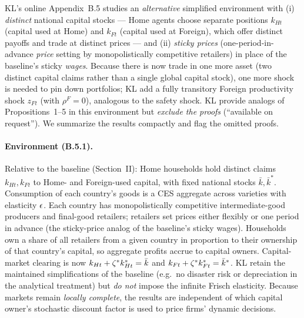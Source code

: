 KL's online Appendix~B.5 studies an \emph{alternative} simplified environment with
(i) \emph{distinct} national capital stocks --- Home agents choose separate
positions $k_{Ht}$ (capital used at Home) and $k_{Ft}$ (capital used at Foreign),
which offer distinct payoffs and trade at distinct prices --- and (ii) \emph{sticky
prices} (one-period-in-advance \emph{price} setting by monopolistically
competitive retailers) in place of the baseline's sticky \emph{wages}. Because
there is now trade in one more asset (two distinct capital claims rather than a
single global capital stock), one more shock is needed to pin down portfolios; KL
add a fully transitory Foreign productivity shock $z_{Ft}$ (with $\rho^{F}=0$),
analogous to the safety shock. KL provide analogs of Propositions~1--5 in this
environment but \emph{exclude the proofs} (``available on request''). We summarize
the results compactly and flag the omitted proofs.


\paragraph{Environment (B.5.1).} Relative to the baseline (Section~II): Home
households hold distinct claims $k_{Ht},k_{Ft}$ to Home- and Foreign-used capital,
with fixed national stocks $\bar k,\bar k^{*}$. Consumption of each country's
goods is a CES aggregate across varieties with elasticity $\epsilon$. Each country has
monopolistically competitive intermediate-good producers and final-good retailers;
retailers set prices either flexibly or one period in advance (the sticky-price
analog of the baseline's sticky wages). Households own a share of all retailers
from a given country in proportion to their ownership of that country's capital, so
aggregate profits accrue to capital owners. Capital-market clearing is now
$k_{Ht}+\zeta^{*}k^{*}_{Ht}=\bar k$ and $k_{Ft}+\zeta^{*}k^{*}_{Ft}=\bar k^{*}$. KL retain the
maintained simplifications of the baseline (e.g.\ no disaster risk or depreciation
in the analytical treatment) but \emph{do not} impose the infinite Frisch
elasticity. Because markets remain \emph{locally complete}, the results are
independent of which capital owner's stochastic discount factor is used to price
firms' dynamic decisions.

